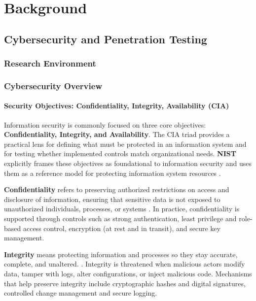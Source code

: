 \part{Background}

\chapter{Cybersecurity and Penetration Testing}

\section{Research Environment}
\label{subsec:ch1-environment}


\section{Cybersecurity Overview}
\label{subsec:ch1-overview}



\subsection{Security Objectives: Confidentiality, Integrity, Availability (CIA)}
\label{subsubsec:ch1-cia}
Information security is commonly focused on three core objectives: \textbf{Confidentiality, Integrity, and Availability}.
The CIA triad provides a practical lens for defining what must be protected in an information system and for testing whether implemented controls match organizational needs. \textbf{NIST} explicitly frames these objectives as foundational to information security
and uses them as a reference model for protecting information system resources \cite{nistCIA,nistSP80012}.

\textbf{Confidentiality} refers to preserving authorized restrictions on access and disclosure of information, ensuring that
sensitive data is not exposed to unauthorized individuals, processes, or systems \cite{nistCIA}. In practice, confidentiality is supported through controls such as strong authentication, least privilege and role-based access control, encryption (at rest and in transit), and secure key management.

\textbf{Integrity} means protecting information and processes so they stay accurate, complete, and unaltered. \cite{nistCIA}. Integrity is threatened when malicious actors modify data, tamper with logs, alter configurations, or inject malicious code. Mechanisms that help preserve integrity include cryptographic hashes and digital signatures, controlled change management and secure logging.

